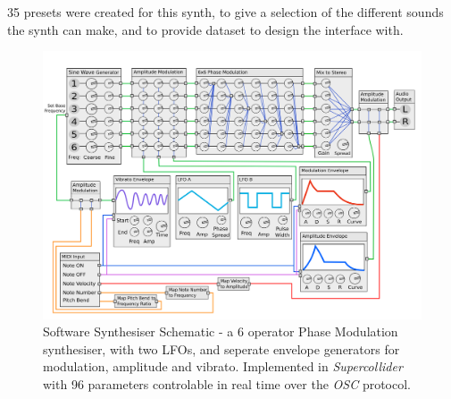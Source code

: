 \documentclass[11pt, oneside]{report}   	%
\begin{document}
35 presets were created for this synth, to give a selection of the different sounds the synth can make, and to provide dataset to design the interface with.
\begin{figure}[h] 
	\centering
	\hspace*{-1cm}
	\includegraphics[width = 7in]{SynthSchematic.png}
	\caption{Software Synthesiser Schematic - a 6 operator Phase Modulation synthesiser, with two LFOs, and seperate envelope generators for modulation, amplitude and vibrato. Implemented in \emph{Supercollider} with 96 parameters controlable in real time over the \emph{OSC} protocol.}\label{fig:SynthSchematic}
\end{figure}
\end{document}
